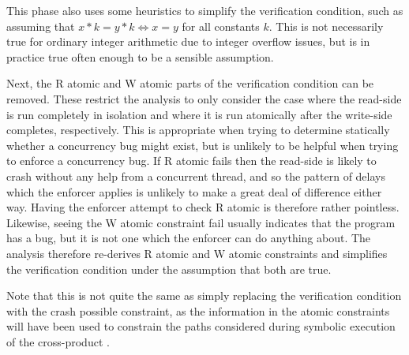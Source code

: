 This phase also uses some heuristics to simplify the verification
condition, such as assuming that $x * k = y * k \Leftrightarrow x = y$
for all constants $k$.  This is not necessarily true for ordinary
integer arithmetic due to integer overflow issues, but is in practice
true often enough to be a sensible assumption.

Next, the R atomic and W atomic parts of the verification condition
can be removed.  These restrict the analysis to only consider the case
where the read-side is run completely in isolation and where it is run
atomically after the write-side completes, respectively.  This is
appropriate when trying to determine statically whether a concurrency
bug might exist, but is unlikely to be helpful when trying to enforce
a concurrency bug.  If R atomic fails then the read-side is likely to
crash without any help from a concurrent thread, and so the pattern of
delays which the enforcer applies is unlikely to make a great deal of
difference either way.  Having the enforcer attempt to check R atomic
is therefore rather pointless.  Likewise, seeing the W atomic
constraint fail usually indicates that the program has a bug, but it
is not one which the enforcer can do anything about.  The analysis
therefore re-derives R atomic and W atomic constraints and simplifies
the verification condition under the assumption that both are true.

Note that this is not quite the same as simply replacing the
verification condition with the crash possible constraint, as the
information in the atomic constraints will have been used to constrain
the paths considered during symbolic execution of the cross-product
{\StateMachine}.  


